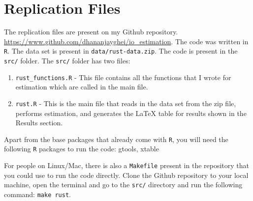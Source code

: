 \documentclass[11pt,letterpaper]{article}
\begin{document}
\section{Replication Files}
The replication files are present on my Github
repository. \url{https://www.github.com/dhananjayghei/io_estimation}.
The code was written in \texttt{R}. The data set is present in
\texttt{data/rust-data.zip}. The code is present in the \texttt{src/}
folder. The \texttt{src/} folder has two files:
\begin{enumerate}
\item \texttt{rust\_functions.R} - This file contains all the functions
  that I wrote for estimation which are called in the main file.
\item \texttt{rust.R} - This is the main file that reads in the data
  set from the zip file, performs estimation, and generates the \LaTeX
  table for results shown in the Results section.
\end{enumerate}
Apart from the base packages that already come with \texttt{R}, you
will need the following \texttt{R} packages to run the code: gtools,
xtable

For people on Linux/Mac, there is also a \texttt{Makefile} present
in the repository that you could use to run the code
directly. Clone the Github repository to your local machine, open the
terminal and go to the \texttt{src/} directory and run the following
command: \texttt{make rust}.
\newpage

\end{document}
